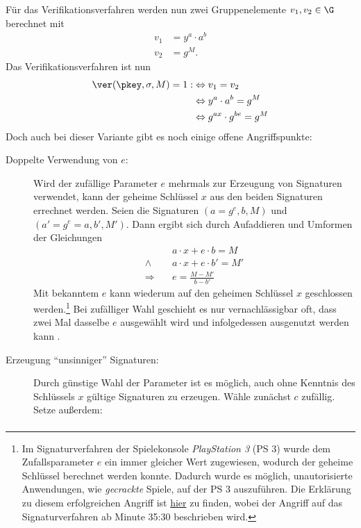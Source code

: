 Für das Verifikationsverfahren werden nun zwei Gruppenelemente $v_1,
v_2 \in \G$ berechnet mit
\begin{align*}
  v_1 &= y^a \cdot a^b\\
  v_2 &= g^M.
\end{align*}
Das Verifikationsverfahren ist nun
\begin{align*}
\ver(\pkey,\sigma,M) = 1 : & \Leftrightarrow v_1 = v_2 \\
 &\Leftrightarrow y^a \cdot a^b = g^M \\
 &\Leftrightarrow  g^{ax} \cdot g^{be} = g^M
\end{align*}
Doch auch bei dieser Variante gibt es noch einige offene Angriffspunkte:
\begin{description}
	\item[Doppelte Verwendung von $e$:]
	Wird der zufällige Parameter $e$ mehrmals zur Erzeugung von Signaturen verwendet, kann der geheime Schlüssel $x$ aus den beiden Signaturen errechnet werden. Seien die Signaturen $(a = g^e, b, M)$ und $(a' = g^{e} = a, b', M')$. Dann ergibt sich durch Aufaddieren und Umformen
	der Gleichungen
	\begin{align*}
	&a \cdot x + e \cdot b = M\\
	\land \quad &a \cdot x + e \cdot b' = M'\\
	\Rightarrow \quad &e = \frac{M - M'}{b - b'}
	\end{align*}
	Mit bekanntem $e$ kann wiederum auf den geheimen Schlüssel $x$
        geschlossen werden.\footnote{Im Signaturverfahren der
          Spielekonsole \textit{PlayStation 3} (PS 3) wurde dem
          Zufallsparameter $e$ ein immer gleicher Wert zugewiesen,
          wodurch der geheime Schlüssel berechnet werden konnte. Dadurch
          wurde es möglich, unautorisierte Anwendungen, wie
          \textit{gecrackte} Spiele, auf der PS 3 auszuführen. Die
          Erklärung zu diesem erfolgreichen Angriff ist
          \href{https://www.youtube.com/watch?v=4loZGYqaZ7I}{hier} zu
          finden, wobei der Angriff auf das Signaturverfahren ab Minute
          35:30 beschrieben wird.} Bei zufälliger Wahl geschieht es nur
        vernachlässigbar oft, dass zwei Mal dasselbe $e$ ausgewählt wird
        und infolgedessen ausgenutzt werden kann .
	\item[Erzeugung "`unsinniger"' Signaturen:]
	Durch günstige Wahl der Parameter ist es möglich, auch ohne Kenntnis des Schlüssels $x$ gültige Signaturen zu erzeugen. Wähle zunächst $c$
	zufällig. Setze außerdem:
	\begin{align*}

\end{align*}
\end{description}
